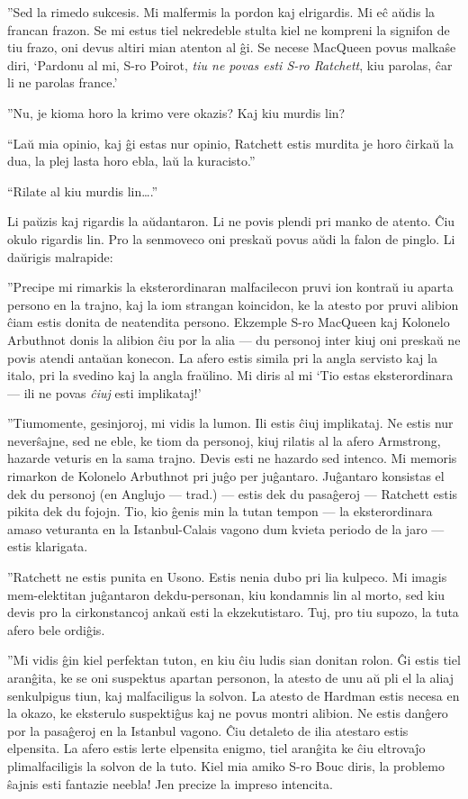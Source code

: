 ''Sed la rimedo sukcesis. Mi malfermis la pordon kaj elrigardis. Mi eĉ aŭdis la francan frazon. Se mi estus tiel nekredeble stulta kiel ne kompreni la signifon de tiu frazo, oni devus altiri mian atenton al ĝi. Se necese MacQueen povus malkaŝe diri, `Pardonu al mi, S-ro Poirot, \emph{tiu ne povas esti S-ro Ratchett}, kiu parolas, ĉar li ne parolas france.'

''Nu, je kioma horo la krimo vere okazis? Kaj kiu murdis lin?

``Laŭ mia opinio, kaj ĝi estas nur opinio, Ratchett estis murdita je horo ĉirkaŭ la dua, la plej lasta horo ebla, laŭ la kuracisto.''

``Rilate al kiu murdis lin{\ldots}.''

Li paŭzis kaj rigardis la aŭdantaron. Li ne povis plendi pri manko de atento. Ĉiu okulo rigardis lin. Pro la senmoveco oni preskaŭ povus aŭdi la falon de pinglo. Li daŭrigis malrapide:

''Precipe mi rimarkis la eksterordinaran malfacilecon pruvi ion kontraŭ iu aparta persono en la trajno, kaj la iom strangan koincidon, ke la atesto por pruvi alibion ĉiam estis donita de neatendita persono. Ekzemple S-ro MacQueen kaj Kolonelo Arbuthnot donis la alibion ĉiu por la alia --- du personoj inter kiuj oni preskaŭ ne povis atendi antaŭan konecon. La afero estis simila pri la angla servisto kaj la italo, pri la svedino kaj la angla fraŭlino. Mi diris al mi `Tio estas eksterordinara --- ili ne povas \emph{ĉiuj} esti implikataj!'

''Tiumomente, gesinjoroj, mi vidis la lumon. Ili estis ĉiuj implikataj. Ne estis nur neverŝajne, sed ne eble, ke tiom da personoj, kiuj rilatis al la afero Armstrong, hazarde veturis en la sama trajno. Devis esti ne hazardo sed intenco. Mi memoris rimarkon de Kolonelo Arbuthnot pri juĝo per juĝantaro. Juĝantaro konsistas el dek du personoj (en Anglujo --- trad.) --- estis dek du pasaĝeroj --- Ratchett estis pikita dek du fojojn. Tio, kio ĝenis min la tutan tempon --- la eksterordinara amaso veturanta en la Istanbul-Calais vagono dum kvieta periodo de la jaro --- estis klarigata.

''Ratchett ne estis punita en Usono. Estis nenia dubo pri lia kulpeco. Mi imagis mem-elektitan juĝantaron dekdu-personan, kiu kondamnis lin al morto, sed kiu devis pro la cirkonstancoj ankaŭ esti la ekzekutistaro. Tuj, pro tiu supozo, la tuta afero bele ordiĝis.

''Mi vidis ĝin kiel perfektan tuton, en kiu ĉiu ludis sian donitan rolon. Ĝi estis tiel aranĝita, ke se oni suspektus apartan personon, la atesto de unu aŭ pli el la aliaj senkulpigus tiun, kaj malfaciligus la solvon. La atesto de Hardman estis necesa en la okazo, ke eksterulo suspektiĝus kaj ne povus montri alibion. Ne estis danĝero por la pasaĝeroj en la Istanbul vagono. Ĉiu detaleto de ilia atestaro estis elpensita. La afero estis lerte elpensita enigmo, tiel aranĝita ke ĉiu eltrovaĵo plimalfaciligis la solvon de la tuto. Kiel mia amiko S-ro Bouc diris, la problemo ŝajnis esti fantazie neebla! Jen precize la impreso intencita.

